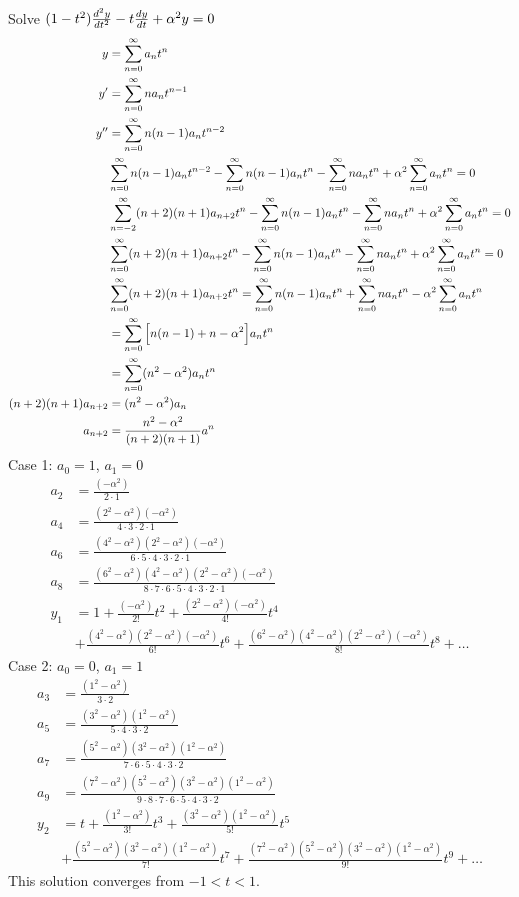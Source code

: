 \documentclass[12pt]{article}
\begin{document}
\begin{example} Solve $(1 - t^2)\frac{d^2y}{dt^2} - t\frac{dy}{dt} + \alpha^2y = 0$ $$\begin{aligned} y &= \sum_{n = 0}^{\infty} a_nt^n \\ y' &= \sum_{n = 0}^{\infty} na_nt^{n - 1} \\ y'' &= \sum_{n = 0}^{\infty} n(n - 1)a_nt^{n - 2} \\ &\sum_{n = 0}^{\infty} n(n - 1)a_nt^{n - 2} - \sum_{n = 0}^{\infty} n(n - 1)a_nt^n - \sum_{n = 0}^{\infty} na_nt^n + \alpha^2 \sum_{n = 0}^{\infty} a_nt^n = 0 \\ &\sum_{n = -2}^{\infty} (n + 2)(n + 1)a_{n + 2}t^n - \sum_{n = 0}^{\infty} n(n - 1)a_nt^n - \sum_{n = 0}^{\infty} na_nt^n + \alpha^2 \sum_{n = 0}^{\infty} a_nt^n = 0 \\ &\sum_{n = 0}^{\infty} (n + 2)(n + 1)a_{n + 2}t^n - \sum_{n = 0}^{\infty} n(n - 1)a_nt^n - \sum_{n = 0}^{\infty} na_nt^n + \alpha^2 \sum_{n = 0}^{\infty} a_nt^n = 0 \\ &\sum_{n = 0}^{\infty} (n + 2)(n + 1)a_{n + 2}t^n = \sum_{n = 0}^{\infty} n(n - 1)a_nt^n + \sum_{n = 0}^{\infty} na_nt^n - \alpha^2 \sum_{n = 0}^{\infty} a_nt^n  \\ &= \sum_{n = 0}^{\infty} \Big[ n(n - 1) + n - \alpha^2\Big] a_nt^n \\ &= \sum_{n = 0}^{\infty} (n^2 - \alpha^2)a_nt^n \\ (n + 2)(n + 1)a_{n + 2} &= (n^2 - \alpha^2)a_n \\ a_{n + 2} &= \frac{n^2 - \alpha^2}{(n + 2)(n + 1)}a^n \end{aligned} $$ 
Case 1: $a_0 = 1$, $a_1 = 0$ $$\begin{aligned} a_2 &= \frac{(-\alpha^2)}{2 \cdot 1} \\ a_4 &= \frac{(2^2 - \alpha^2)(-\alpha^2)}{4 \cdot 3 \cdot 2 \cdot 1} \\ a_6 &= \frac{(4^2 - \alpha^2)(2^2 - \alpha^2)(-\alpha^2)}{6 \cdot 5 \cdot 4 \cdot 3 \cdot 2 \cdot 1} \\ a_8 &= \frac{(6^2 - \alpha^2)(4^2 - \alpha^2)(2^2 - \alpha^2)(-\alpha^2)}{8 \cdot 7 \cdot 6 \cdot 5 \cdot 4 \cdot 3 \cdot 2 \cdot 1} \\ y_1 &= 1 + \frac{(-\alpha^2)}{2!}t^2 + \frac{(2^2 - \alpha^2)(-\alpha^2)}{4!}t^4 \\ &+ \frac{(4^2 - \alpha^2)(2^2 - \alpha^2)(-\alpha^2)}{6!}t^6 + \frac{(6^2 - \alpha^2)(4^2 - \alpha^2)(2^2 - \alpha^2)(-\alpha^2)}{8!}t^8 + \dots \end{aligned} $$ 
Case 2: $a_0 = 0$, $a_1 = 1$ $$\begin{aligned} a_3 &= \frac{(1^2 - \alpha^2)}{3 \cdot 2} \\ a_5 &= \frac{(3^2 - \alpha^2)(1^2 - \alpha^2)}{5 \cdot 4 \cdot 3 \cdot 2} \\ a_7 &= \frac{(5^2 - \alpha^2)(3^2 - \alpha^2)(1^2 - \alpha^2)}{7 \cdot 6 \cdot 5 \cdot 4 \cdot 3 \cdot 2} \\ a_9 &= \frac{(7^2 - \alpha^2)(5^2 - \alpha^2)(3^2 - \alpha^2)(1^2 - \alpha^2)}{9 \cdot 8 \cdot 7 \cdot 6 \cdot 5 \cdot 4 \cdot 3 \cdot 2} \\ y_2 &= t + \frac{(1^2 - \alpha^2)}{3!}t^3 + \frac{(3^2 - \alpha^2)(1^2 - \alpha^2)}{5!}t^5 \\ &+ \frac{(5^2 - \alpha^2)(3^2 - \alpha^2)(1^2 - \alpha^2)}{7!}t^7 + \frac{(7^2 - \alpha^2)(5^2 - \alpha^2)(3^2 - \alpha^2)(1^2 - \alpha^2)}{9!}t^9 + \dots \end{aligned} $$ 
This solution converges from $-1 < t < 1$. \end{example} 
\end{document}

